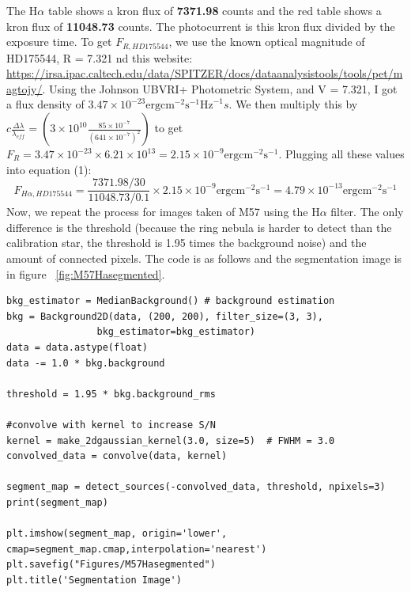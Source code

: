 \documentclass{article}
\begin{document}
The H$\alpha$ table shows a kron flux of \textbf{7371.98} counts and the red table shows a kron flux of \textbf{11048.73} counts. The photocurrent is this kron flux divided by the exposure time. To get $F_{R, HD175544}$, we use the known optical magnitude of HD175544, R = 7.321 nd this website: \url{https://irsa.ipac.caltech.edu/data/SPITZER/docs/dataanalysistools/tools/pet/magtojy/}. Using the Johnson UBVRI+ Photometric System, and V = 7.321, I got a flux density of $3.47 \times 10^{-23} \mathrm{erg} \mathrm{cm}^{-2} \mathrm{s}^{-1} \mathrm{Hz}^{-1}s$. We then multiply this by $c\frac{\Delta \lambda}{\lambda_{eff}} = (3 \times 10^{10} \frac{85 \times 10^{-7}}{(641 \times 10^{-7})^2})$ to get $F_R = 3.47 \times 10^{-23} \times 6.21 \times10^{13} = 2.15 \times10^{-9} \mathrm{erg} \mathrm{cm}^{-2} \mathrm{s}^{-1}$. Plugging all these values into equation (1):
\[
F_{H\alpha, HD175544} = \frac{7371.98 / 30}{11048.73 / 0.1} \times 2.15 \times10^{-9} \mathrm{erg} \mathrm{cm}^{-2} \mathrm{s}^{-1} = 4.79 \times 10^{-13} \mathrm{erg} \mathrm{cm}^{-2} \mathrm{s}^{-1}
\]
Now, we repeat the process for images taken of M57 using the H$\alpha$ filter. The only difference is the threshold (because the ring nebula is harder to detect than the calibration star, the threshold is 1.95 times the background noise) and the amount of connected pixels. The code is as follows and the segmentation image is in figure ~\ref{fig:M57Hasegmented}.
\begin{verbatim}
bkg_estimator = MedianBackground() # background estimation
bkg = Background2D(data, (200, 200), filter_size=(3, 3),
                bkg_estimator=bkg_estimator)
data = data.astype(float)
data -= 1.0 * bkg.background

threshold = 1.95 * bkg.background_rms

#convolve with kernel to increase S/N 
kernel = make_2dgaussian_kernel(3.0, size=5)  # FWHM = 3.0
convolved_data = convolve(data, kernel)

segment_map = detect_sources(-convolved_data, threshold, npixels=3)
print(segment_map)

plt.imshow(segment_map, origin='lower', cmap=segment_map.cmap,interpolation='nearest')
plt.savefig("Figures/M57Hasegmented")
plt.title('Segmentation Image')
\end{verbatim}
\end{document}
